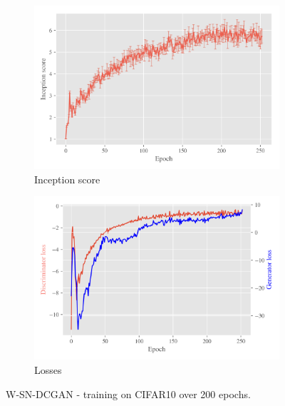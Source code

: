 \begin{figure}[H]
    \centering
    \begin{subfigure}[t]{0.49\textwidth}
        \centering
		\includegraphics[width=\textwidth]{../code/results/figures/w-sn-dcgan_cifar10_is.png}
		\caption{Inception score}
		\label{fig:exp-w-sn-dcgan-is}
    \end{subfigure}
    \begin{subfigure}[t]{0.49\textwidth}
        \centering
        \includegraphics[width=\textwidth]{../code/results/figures/w-sn-dcgan_cifar10_losses.png}
		\caption{Losses}
		\label{fig:exp-w-sn-dcgan-losses}
    \end{subfigure}
    \caption{W-SN-DCGAN - training on CIFAR10 over 200 epochs.}
\end{figure}